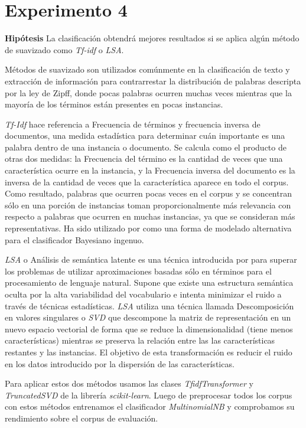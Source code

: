 \section{Experimento 4}
\vspace{3 mm}
\textbf{Hipótesis} La clasificación obtendrá mejores resultados si se aplica algún método de suavizado como \textit{Tf-idf} o \textit{LSA}.
\vspace{3 mm}

Métodos de suavizado son utilizados comúnmente en la clasificación de texto y extracción de información para contrarrestar la distribución de palabras descripta por la ley de Zipff, donde pocas palabras ocurren muchas veces mientras que la mayoría de los términos están presentes en pocas instancias.

\textit{Tf-Idf} hace referencia a Frecuencia de términos y frecuencia inversa de documentos, una medida estadística para determinar cuán importante es una palabra dentro de una instancia o documento. Se calcula como el producto de otras dos medidas: la Frecuencia del término es la cantidad de veces que una característica ocurre en la instancia, y la Frecuencia inversa del documento es la inversa de la cantidad de veces que la característica aparece en todo el corpus. Como resultado, palabras que ocurren pocas veces en el corpus y se concentran sólo en una porción de instancias toman proporcionalmente más relevancia con respecto a palabras que ocurren en muchas instancias, ya que se consideran más representativas. Ha sido utilizado por \citet{tackling-mnb} como una forma de modelado alternativa para el clasificador Bayesiano ingenuo.

\textit{LSA} o Análisis de semántica latente es una técnica introducida por \citet{lsa} para superar los problemas de utilizar aproximaciones basadas sólo en términos para el procesamiento de lenguaje natural. Supone que existe una estructura semántica oculta por la alta variabilidad del vocabulario e intenta minimizar el ruido a través de técnicas estadísticas. \textit{LSA} utiliza una técnica llamada Descomposición en valores singulares o \textit{SVD} que descompone la matriz de representación en un nuevo espacio vectorial de forma que se reduce la dimensionalidad (tiene menos características) mientras se preserva la relación entre las las características restantes y las instancias. El objetivo de esta transformación es reducir el ruido en los datos introducido por la dispersión de las características.

Para aplicar estos dos métodos usamos las clases \textit{TfidfTransformer} y \textit{TruncatedSVD} de la librería \textit{scikit-learn}. Luego de preprocesar todos los corpus con estos métodos entrenamos el clasificador \textit{MultinomialNB} y comprobamos su rendimiento sobre el corpus de evaluación.

